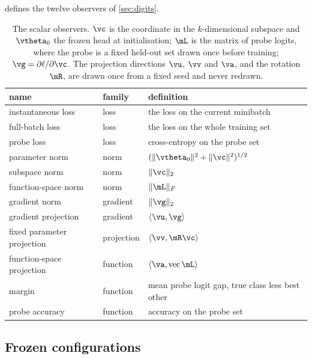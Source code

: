 \documentclass{article}
\begin{document}
 defines the twelve observers of \cref{sec:digits}.

\begin{table}[H]
\centering
\caption{The scalar observers. $\vc$ is the coordinate in the $k$-dimensional subspace and
$\vtheta_0$ the frozen head at initialisation; $\mL$ is the matrix of probe logits, where the probe
is a fixed held-out set drawn once before training; $\vg = \partial \ell / \partial \vc$. The
projection directions $\vu$, $\vv$ and $\va$, and the rotation $\mR$, are drawn once from a fixed
seed and never redrawn.}
\label{tab:obsdef}
\begin{tabular}{lll}
\toprule
name & family & definition \\
\midrule
instantaneous loss          & loss       & the loss on the current minibatch \\
full-batch loss             & loss       & the loss on the whole training set \\
probe loss                  & loss       & cross-entropy on the probe set \\
parameter norm              & norm       & $(\lVert \vtheta_0 \rVert^2 + \lVert \vc \rVert^2)^{1/2}$ \\
subspace norm               & norm       & $\lVert \vc \rVert_2$ \\
function-space norm         & norm       & $\lVert \mL \rVert_F$ \\
gradient norm               & gradient   & $\lVert \vg \rVert_2$ \\
gradient projection         & gradient   & $\langle \vu, \vg \rangle$ \\
fixed parameter projection  & projection & $\langle \vv, \mR\vc \rangle$ \\
function-space projection   & function   & $\langle \va, \operatorname{vec} \mL \rangle$ \\
margin                      & function   & mean probe logit gap, true class less best other \\
probe accuracy              & function   & accuracy on the probe set \\
\bottomrule
\end{tabular}
\end{table}

\subsection{Frozen configurations}\label{app:config}
\end{document}
